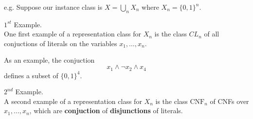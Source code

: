 \begin{example}
    e.g. Suppose our instance class is $X = \bigcup_n X_n$ where $X_n = \{0, 1\}^n$. \vspace{7pt}

    $1^{st}$ Example. \\
    One first example of a representation class for $X_n$ is the class $CL_n$ of all conjuctions of literals on the variables $x_1, \dots, x_n$. \vspace{7pt}

    As an example, the conjuction 
    $$x_1 \wedge \neg x_2 \wedge x_4$$
    defines a subset of $\{0,1\}^4$. \vspace{7pt}

    $2^{nd}$ Example. \\
    A second example of a representation class for $X_n$ is the class $\text{CNF}_n$ of CNFs over $x_1, \dots, x_n$, which are \textbf{conjuction} 
    of \textbf{disjunctions} of literals.
\end{example}